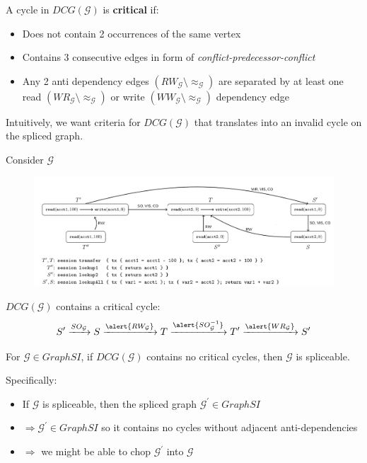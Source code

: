 \documentclass{beamer}
\begin{document}
\begin{frame}
	\begin{definition}
		A cycle in $DCG(\mathcal{G})$ is \textbf{critical} if:
		\begin{itemize}
			\item Does not contain 2 occurrences of the same vertex 
			\item Contains 3 consecutive edges in form of \textsl{conflict-predecessor-conflict}
			\item Any 2 anti dependency edges $(RW_\mathcal{G}\setminus \approx_\mathcal{G})$ are separated by at least one read $(WR_\mathcal{G}\setminus \approx_\mathcal{G})$ or write $(WW_\mathcal{G}\setminus \approx_\mathcal{G})$ dependency edge
		\end{itemize}
	\end{definition}
	Intuitively, we want criteria for $DCG(\mathcal{G})$ that translates into an invalid cycle on the spliced graph.
\end{frame}


\begin{frame}
	Consider $\mathcal{G}$
	\begin{figure}
		\includegraphics[scale=0.25]{fig4}
	\end{figure}
	\begin{example}
		$DCG(\mathcal{G})$ contains a critical cycle:
		$$  
			S^\prime \xrightarrow{SO_\mathcal{G}}
			S \xrightarrow{\alert{RW_\mathcal{G}}} 
			T \xrightarrow{\alert{SO^{-1}_\mathcal{G}}} 
			T^\prime \xrightarrow{\alert{WR_\mathcal{G}}} 
			S^\prime
		$$
	\end{example}
\end{frame}


\begin{frame}
	\begin{theorem}
		For $\mathcal{G} \in GraphSI$, if $DCG(\mathcal{G})$ contains no critical cycles, then $\mathcal{G}$ is spliceable.
	\end{theorem}
	Specifically:
	\begin{itemize}
		\item If $\mathcal{G}$ is spliceable, then the spliced graph $\mathcal{G}^\prime \in GraphSI$
		\item $\Rightarrow \mathcal{G}^\prime \in GraphSI$ so it contains no cycles without adjacent anti-dependencies
		\item $\Rightarrow$ we might be able to chop $\mathcal{G}^\prime$ into $\mathcal{G}$
	\end{itemize}
\end{frame}
\end{document}
